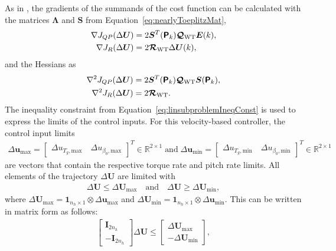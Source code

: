 As in \cite{gonzalez2020nonlinear}, the gradients of the summands of the cost function can be calculated with the matrices $\bm{\Lambda}$ and $\bm{S}$ from Equation~\eqref{eq:nearlyToeplitzMat},
\begin{align*}
    \nabla J_{QP}(\Delta \bm{U}) &= 2\bm{S}^T(\bm{\mathsf{P}}_k) \bm{\mathcal{Q}}_{\text{WT}} \bm{E}(k),\\
    \nabla J_R(\Delta \bm{U}) &= 2 \bm{\mathcal{R}}_{\text{WT}} \Delta \bm{U}(k),
\end{align*}
and the Hessians as
\begin{align*}
    \nabla^2 J_{QP}(\Delta \bm{U}) &= 2\bm{S}^T(\bm{\mathsf{P}}_k) \bm{\mathcal{Q}}_{\text{WT}} \bm{S}(\bm{\mathsf{P}}_k),\\
    \nabla^2 J_R(\Delta \bm{U}) &= 2 \bm{\mathcal{R}}_{\text{WT}}.
\end{align*}
The inequality constraint from Equation~\eqref{eq:linsubproblemIneqConst} is used to express the limits of the control inputs. For this velocity-based controller, the control input limits
\begin{align*}
    \Delta \bm{u}_{\text{max}} = \begin{bmatrix} \Delta u_{T_g, \text{max}} \quad \Delta u_{\beta_0, \text{max}} \end{bmatrix}^T \in \mathbb{R}^{2 \times 1} \; \text{and}\;
    \Delta \bm{u}_{\text{min}} = \begin{bmatrix} \Delta u_{T_g, \text{min}} \quad \Delta u_{\beta_0, \text{min}} \end{bmatrix}^T \in \mathbb{R}^{2 \times 1}
\end{align*}
are vectors that contain the respective torque rate and pitch rate limits. All elements of the trajectory $\Delta \bm{U}$ are limited with
\begin{align*}
    \Delta \bm{U} \leq \Delta \bm{U}_{\text{max}} \quad \text{and} \quad \Delta \bm{U} \geq \Delta \bm{U}_{\text{min}},
\end{align*}
where $\Delta \bm{U}_{\text{max}} = \bm{1}_{n_h \times 1}\otimes \Delta \bm{u}_{\text{max}}$ and $\Delta \bm{U}_{\text{min}} = \bm{1}_{n_h \times 1}\otimes \Delta \bm{u}_{\text{min}}$.
This can be written in matrix form as follows:
\begin{align*}
    \begin{bmatrix}
        \bm{I}_{2n_h} \\
        -\bm{I}_{2n_h}
    \end{bmatrix} \Delta \bm{U} \leq
    \begin{bmatrix}
        \Delta \bm{U}_{\text{max}} \\
        -\Delta \bm{U}_{\text{min}}\end{bmatrix},
\end{align*}
